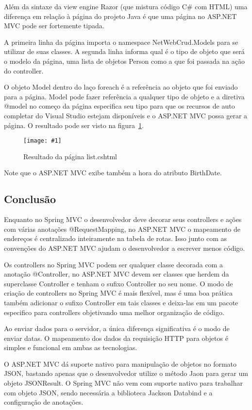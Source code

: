 \documentclass[a4paper,12pt]{article}
\newenvironment{simple}%
{\noindent}%
{\par\noindent}
\newcommand{\figura}[3] {
	\begin{figure}[H]
		\centering
		\texttt{[image: \#1]}
		\caption{#2}
		\label{#3}
	\end{figure}
	\FloatBarrier
}
\newcommand{\sharpcode}[3] {
	\begin{simple}
	\inputminted[fontsize=\footnotesize]{csharp}{#1}
	\captionof{listing}{#2}
	\label{#3}
	\end{simple}
	\FloatBarrier
}
\begin{document}
\sharpcode{code/21.txt}{Código fonte da página list.cshtml}{lst:21}

Além da sintaxe da view engine Razor (que mistura código C\# com HTML) uma diferença em relação à página do projeto Java é que uma página no ASP.NET MVC pode ser fortemente tipada.

A primeira linha da página importa o namespace NetWebCrud.Models para se utilizar de suas classes. A segunda linha informa qual é o tipo de objeto que será o modelo da página, uma lista de objetos Person como a que foi passada na ação do controller.

O objeto Model dentro do laço foreach é a referência ao objeto que foi enviado para a página. Model pode fazer referência a qualquer tipo de objeto e a diretiva @model no começo da página especifica seu tipo para que os recursos de auto completar do Visual Studio estejam disponíveis e o ASP.NET MVC possa gerar a página. O resultado pode ser visto na figura~\ref{fig:35}.

\figura{35.png}{Resultado da página list.cshtml}{fig:35}

Note que o ASP.NET MVC exibe também a hora do atributo BirthDate.

\subsection{Conclusão}

Enquanto no Spring MVC o desenvolvedor deve decorar seus controllers e ações com várias anotações @RequestMapping, no ASP.NET MVC o mapeamento de endereços é centralizado inteiramente na tabela de rotas. Isso junto com as convenções do ASP.NET MVC ajudam o desenvolvedor a escrever menos código.

Os controllers no Spring MVC podem ser qualquer classe decorada com a anotação @Controller, no ASP.NET MVC devem ser classes que herdem da superclasse Controller e tenham o sufixo Controller no seu nome. O modo de criação de controllers no Spring MVC é mais flexível, mas é uma boa prática também adicionar o sufixo Controller em tais classes e deixa-las em um pacote especifico para controllers objetivando uma melhor organização de código.

Ao enviar dados para o servidor, a única diferença significativa é o modo de enviar datas. O mapeamento dos dados da requisição HTTP para objetos é simples e funcional em ambas as tecnologias.

O ASP.NET MVC dá suporte nativo para manipulação de objetos no formato JSON, bastando apenas que o desenvolvedor utilize o método Jaon para gerar um objeto JSONResult. O Spring MVC não vem com suporte nativo para trabalhar com objeto JSON, sendo necessária a biblioteca Jackson Databind e a configuração de anotações.
\end{document}
